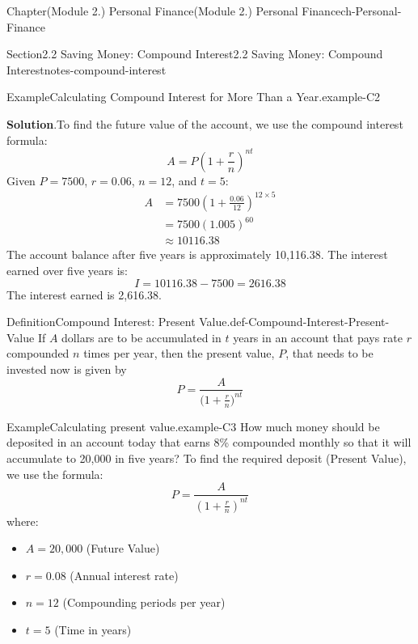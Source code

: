 \documentclass[oneside,10pt,]{book}
\newcommand{\blocktitlefont}{\relax}
\newcommand{\ptxlistdisc}{\raisebox{0.3ex}{\textbullet}}
\newcommand{\amp}{&}
\begin{document}
\begin{chapterptx}{Chapter}{(Module 2.) Personal Finance}{}{(Module 2.) Personal Finance}{}{}{ch-Personal-Finance}
\begin{sectionptx}{Section}{2.2 Saving Money: Compound Interest}{}{2.2 Saving Money: Compound Interest}{}{}{notes-compound-interest}
\begin{example}{Example}{Calculating Compound Interest for More Than a Year.}{example-C2}
\par\smallskip%
\noindent\textbf{\blocktitlefont Solution}.\hypertarget{example-C2-3}{}\quad{}To find the future value of the account, we use the compound interest formula:%
%
\begin{equation*}
A = P \left(1 + \frac{r}{n}\right)^{nt}
\end{equation*}
Given \(P = 7500\), \(r = 0.06\), \(n = 12\), and \(t = 5\):%
%
\begin{align*}
A \amp = 7500 \left(1 + \frac{0.06}{12}\right)^{12 \times 5}\\
\amp = 7500(1.005)^{60}\\
\amp \approx 10116.38
\end{align*}
The account balance after five years is approximately \textdollar{}10,116.38. The interest earned over five years is:%
%
\begin{equation*}
I = 10116.38 - 7500 = 2616.38
\end{equation*}
The interest earned is \textdollar{}2,616.38.%
\end{example}
\begin{definition}{Definition}{Compound Interest: Present Value.}{def-Compound-Interest-Present-Value}%
If \(A\) dollars are to be accumulated in \(t\) years in an account that pays rate \(r\) compounded \(n\) times per year, then the present value, \(P\), that needs to be invested now is given by%
\begin{equation*}
P=\dfrac{A}{ \bigl( 1+ \frac{r}{n}\bigr)^{nt}}
\end{equation*}
%
\end{definition}
\begin{example}{Example}{Calculating present value.}{example-C3}%
How much money should be deposited in an account today that earns 8\% compounded monthly so that it will accumulate to \textdollar{}20,000 in five years?%
\noindent\hypertarget{example-C3-3}{}To find the required deposit (Present Value), we use the formula:%
\begin{equation*}
P= \frac{A}{(1 + \frac{r}{n})^{nt}}
\end{equation*}
where:%
\begin{itemize}[label=\ptxlistdisc]
\item{}\(A = 20,000\) (Future Value)%
\item{}\(r = 0.08\) (Annual interest rate)%
\item{}\(n = 12\) (Compounding periods per year)%
\item{}\(t = 5\) (Time in years)%
\end{itemize}

\end{example}
\end{sectionptx}
\end{chapterptx}
\end{document}
